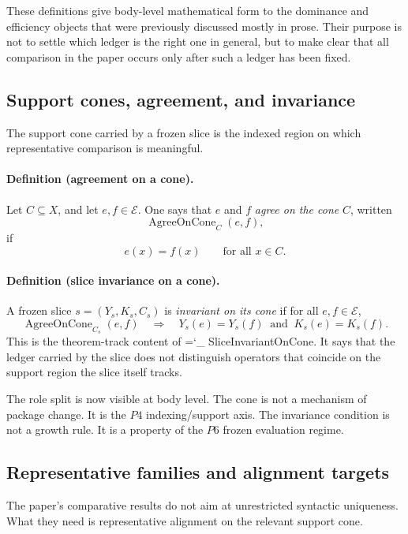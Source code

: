 \documentclass[11pt]{article}
\newcommand{\lid}[1]{{\small\ttfamily\hyphenchar\font=`\_ #1}}
\begin{document}
These definitions give body-level mathematical form to the dominance and efficiency objects that were previously discussed mostly in prose. Their purpose is not to settle which ledger is the right one in general, but to make clear that all comparison in the paper occurs only after such a ledger has been fixed.

\subsection*{Support cones, agreement, and invariance}

The support cone carried by a frozen slice is the indexed region on which representative comparison is meaningful.

\paragraph{Definition (agreement on a cone).}
Let $C\subseteq X$, and let $e,f\in \mathcal{E}$. One says that $e$ and $f$ \emph{agree on the cone} $C$, written
\[
\operatorname{AgreeOnCone}_C(e,f),
\]
if
\[
e(x)=f(x)\qquad \text{for all }x\in C.
\]

\paragraph{Definition (slice invariance on a cone).}
A frozen slice $s=(Y_s,K_s,C_s)$ is \emph{invariant on its cone} if for all $e,f\in \mathcal{E}$,
\[
\operatorname{AgreeOnCone}_{C_s}(e,f)
\quad\Longrightarrow\quad
Y_s(e)=Y_s(f)\ \text{ and }\ K_s(e)=K_s(f).
\]
This is the theorem-track content of \lid{SliceInvariantOnCone}. It says that the ledger carried by the slice does not distinguish operators that coincide on the support region the slice itself tracks.

The role split is now visible at body level. The cone is not a mechanism of package change. It is the \(P4\) indexing/support axis. The invariance condition is not a growth rule. It is a property of the \(P6\) frozen evaluation regime.

\subsection*{Representative families and alignment targets}

The paper's comparative results do not aim at unrestricted syntactic uniqueness. What they need is representative alignment on the relevant support cone.
\end{document}
